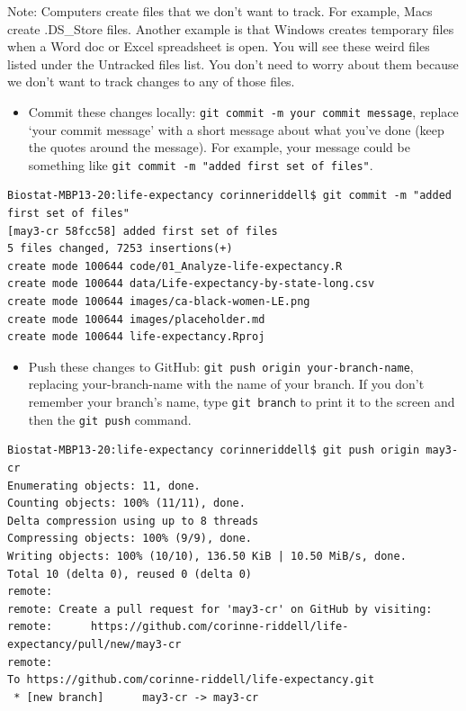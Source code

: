 \documentclass[
]{book}
\providecommand{\tightlist}{%
  \setlength{\itemsep}{0pt}\setlength{\parskip}{0pt}}
\begin{document}
Note: Computers create files that we don't want to track. For example, Macs create
.DS\_Store files. Another example is that Windows creates temporary files when a Word
doc or Excel spreadsheet is open. You will see these weird files listed under the
Untracked files list. You don't need to worry about them because we don't want
to track changes to any of those files.

\begin{itemize}
\tightlist
\item
  Commit these changes locally: \texttt{git\ commit\ -m\ \textquotesingle{}your\ commit\ message\textquotesingle{}}, replace
  `your commit message' with a short message about what you've done (keep the
  quotes around the message). For example, your message could be something like
  \texttt{git\ commit\ -m\ "added\ first\ set\ of\ files"}.
\end{itemize}

\begin{verbatim}
Biostat-MBP13-20:life-expectancy corinneriddell$ git commit -m "added first set of files"
[may3-cr 58fcc58] added first set of files
5 files changed, 7253 insertions(+)
create mode 100644 code/01_Analyze-life-expectancy.R
create mode 100644 data/Life-expectancy-by-state-long.csv
create mode 100644 images/ca-black-women-LE.png
create mode 100644 images/placeholder.md
create mode 100644 life-expectancy.Rproj
\end{verbatim}

\begin{itemize}
\tightlist
\item
  Push these changes to GitHub: \texttt{git\ push\ origin\ your-branch-name}, replacing
  your-branch-name with the name of your branch. If you don't remember your branch's
  name, type \texttt{git\ branch} to print it to the screen and then the \texttt{git\ push} command.
\end{itemize}

\begin{verbatim}
Biostat-MBP13-20:life-expectancy corinneriddell$ git push origin may3-cr
Enumerating objects: 11, done.
Counting objects: 100% (11/11), done.
Delta compression using up to 8 threads
Compressing objects: 100% (9/9), done.
Writing objects: 100% (10/10), 136.50 KiB | 10.50 MiB/s, done.
Total 10 (delta 0), reused 0 (delta 0)
remote: 
remote: Create a pull request for 'may3-cr' on GitHub by visiting:
remote:      https://github.com/corinne-riddell/life-expectancy/pull/new/may3-cr
remote: 
To https://github.com/corinne-riddell/life-expectancy.git
 * [new branch]      may3-cr -> may3-cr
\end{verbatim}
\end{document}
